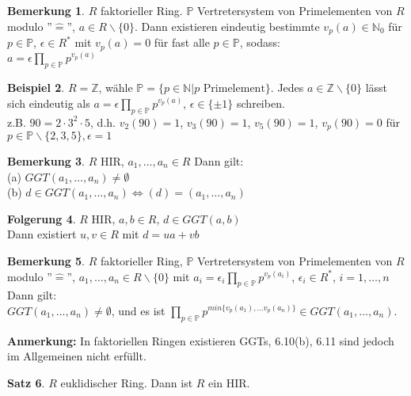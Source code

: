 \documentclass[10pt,a4paper,numbers=endperiod]{scrreprt}
\theoremstyle{definition}
\newtheorem{satz}{Satz}[section]
\newtheorem{bem}[satz]{Bemerkung}
\newtheorem{bsp}[satz]{Beispiel}
\newtheorem{folg}[satz]{Folgerung}
\def\NN{{\mathbb N}}
\def\ZZ{{\mathbb Z}}
\def\PP{{\mathbb P}}
\begin{document}
\begin{bem}
	$R$ faktorieller Ring. $\PP$ Vertretersystem von Primelementen von $R$ modulo ''$\hat{=}$'', $a \in R \backslash \{0\}$. Dann existieren eindeutig bestimmte $v_p(a) \in \NN_0$ für $p \in \PP$, $\epsilon \in R^*$ mit $v_p(a) = 0$ für fast alle $p \in \PP$, sodass:\\
	$a = \epsilon \prod\limits_{p \in \PP} p^{v_p(a)}$
\end{bem}

\begin{bsp}
	$R = \ZZ$, wähle $\PP = \{p \in \NN| p \text{ Primelement}\}$. Jedes $a \in \ZZ \backslash \{0\}$  lässt sich eindeutig als $a = \epsilon \prod\limits_{p \in \PP} p^{v_p(a)}$, $\epsilon \in \{ \pm 1\}$ schreiben.\\
	z.B. $90 = 2 \cdot 3^2 \cdot 5$, d.h. $v_2(90) = 1$, $v_3(90) = 1$, $v_5(90) = 1$, $v_p(90) = 0$ für $p \in \PP \backslash \{2,3,5\}, \epsilon = 1$
\end{bsp}

\begin{bem}
	$R$ HIR, $a_1, \ldots, a_n \in R$ Dann gilt:\\
	(a) $GGT(a_1, \ldots, a_n) \neq \emptyset$\\
	(b) $d \in GGT(a_1, \ldots, a_n) \Leftrightarrow (d) = (a_1, \ldots, a_n)$
\end{bem}

\begin{folg}
	$R$ HIR, $a,b \in R$, $d \in GGT(a,b)$\\
	Dann existiert $u,v \in R$ mit $d = ua + vb$
\end{folg}

\begin{bem}
	$R$ faktorieller Ring, $\PP$ Vertretersystem von Primelementen von $R$ modulo ''$\hat{=}$'', $a_1, \ldots, a_n \in R \backslash \{0\}$ mit $a_i = \epsilon_i \prod\limits_{p \in \PP} p^{v_p(a_i)}$, $\epsilon_i \in R^*$, $i = 1, \ldots, n$\\
	Dann gilt:\\
	$GGT(a_1,\ldots, a_n) \neq \emptyset$, und es ist $\prod\limits_{p \in \PP} p^{min\{v_p(a_1), \ldots v_p(a_n)\}} \in GGT(a_1, \ldots, a_n)$.
\end{bem}

\textbf{Anmerkung:} In faktoriellen Ringen existieren GGTs, 6.10(b), 6.11 sind jedoch im Allgemeinen nicht erfüllt.

\begin{satz}
	$R$ euklidischer Ring. Dann ist $R$ ein HIR.
\end{satz}
\end{document}
